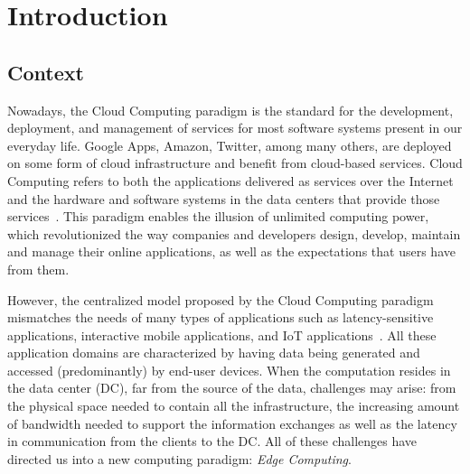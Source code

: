 


\chapter{Introduction}
\label{cha:introduction}



\section{Context} \label{sec:context}

Nowadays, the Cloud Computing paradigm is the standard for the development, deployment, and management of services for most software systems present in our everyday life. Google Apps, Amazon, Twitter, among many others, are deployed on some form of cloud infrastructure and benefit from cloud-based services. Cloud Computing refers to both the applications delivered as services over the Internet and the hardware and software systems in the data centers that provide those services~\cite{10.1145/1721654.1721672}. This paradigm enables the illusion of unlimited computing power, which revolutionized the way companies and developers design, develop, maintain and manage their online applications, as well as the expectations that users have from them.

However, the centralized model proposed by the Cloud Computing paradigm mismatches the needs of many types of applications such as latency-sensitive applications, interactive mobile applications, and IoT applications~\cite{10.1145/3154815}. All these application domains are characterized by having data being generated and accessed (predominantly) by end-user devices. When the computation resides in the data center (DC), far from the source of the data, challenges may arise: from the physical space needed to contain all the infrastructure, the increasing amount of bandwidth needed to support the information exchanges as well as the latency in communication from the clients to the DC. All of these challenges have directed us into a new computing paradigm: \textit{Edge Computing}.


